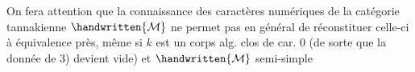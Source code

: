 On fera attention que la connaissance des caractères numériques de la catégorie tannakienne $\handwritten{\mathcal{M}}$ ne permet pas en général de réconstituer celle-ci à équivalence près, même si $k$ est un corps alg. clos de car. 0 (de sorte que la donnée de 3) devient vide) et $\handwritten{\mathcal{M}}$ semi-simple
